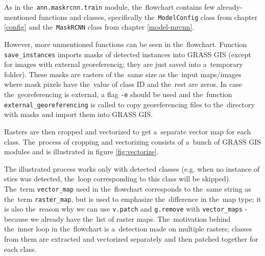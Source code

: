 As in the~\verb|ann.maskrcnn.train| module, the~flowchart contains few 
already-mentioned functions and classes, specifically the~\verb|ModelConfig| 
class from chapter \ref{config} and the~\verb|MaskRCNN| class from chapter 
\ref{model-mrcnn}.

However, more unmentioned functions can be seen in the~flowchart. Function
\verb|save_instances| imports masks of detected instances into GRASS GIS
(except for images with external georeferencig; they are just saved into
a~temporary folder). These masks are rasters of the~same size as the~input
maps/images where mask pixels have the~value of class ID and the~rest are
zeros. In case the~georeferencing is external, a flag \verb|-e| should be
used and the~function \verb|external_georeferencing| is 
called to copy georeferencing files to the~directory with masks and import them
into GRASS GIS.

Rasters are then cropped and vectorized to get a~separate vector map for each
class. The~process of cropping and vectorizing consists of a~bunch of GRASS GIS
modules and is illustrated in figure \ref{fig:vectorize}.

The illustrated process works only with detected classes (e.g. when no instance 
of sties was detected, the~loop corresponding to this class will be skipped). 
The~term \verb|vector_map| used in the~flowchart corresponds to the~same string 
as the~term \verb|raster_map|, but is used to emphasize the~difference in
the~map type; it is also the~reason why we can use \verb|v.patch| and 
\verb|g.remove| with \verb|vector_maps| - because we already have the~list of 
raster maps. The~motivation behind the~inner loop in the~flowchart is
a~detection made on multiple rasters; classes from them are extracted and 
vectorized separately and then patched together for each class.

